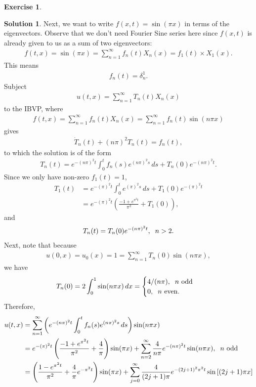 \documentclass{article}
\theoremstyle{definition}
\newtheorem*{exer*}{Exercise}
\newtheorem*{sln*}{Solution}
\begin{document}
\begin{exer*}
\begin{sln*}
		Next, we want to write $f(x,t) = \sin(\pi x)$ in terms of the eigenvectors. Observe that we don't need Fourier Sine series here since $f(x,t)$ is already given to us as a sum of two eigenvectors:
		\begin{align*}
		f(t,x) = \sin(\pi x) = \sum^\infty_{n=1}f_n(t)X_n(x) = f_1(t) \times X_1(x).
		\end{align*}
		This means
		\begin{align*}
		f_n(t) = \delta^1_n.
		\end{align*}
		Subject 
		\begin{align*}
		u(t,x) = \sum^\infty_{n=1} T_n(t)X_n(x)
		\end{align*}
		to the IBVP, where
		\begin{align*}
		f(t,x) = \sum^\infty_{n=1}f_n(t)X_n(x) = \sum^\infty_{n=1}f_n(t)\sin(n\pi x)
		\end{align*}
		gives
		\begin{align*}
		\dot{T}_n(t) + (n\pi)^2T_n(t) = f_n(t),
		\end{align*}
		to which the solution is of the form
		\begin{align*}
		T_n(t) = e^{-(n\pi)^2t}\int^t_0 f_n(s)e^{(n\pi)^2s}\,ds + T_n(0)e^{-(n\pi)^2t}.
		\end{align*}
		Since we only have non-zero $f_1(t) = 1$, 
		\begin{align*}
		T_1(t) &= e^{-(\pi)^2t}\int^t_0 e^{(\pi)^2s}\,ds + T_1(0)e^{-(\pi)^2t}\\
		&= e^{-(\pi)^2t}\left(\frac{-1 + e^{\pi^2t}}{\pi^2}  + T_1(0)\right),
		\end{align*}
		and
		\begin{align*}
		T_n(t) = T_n(0)e^{-(n\pi)^2t}, \hspace{0.2cm}n > 2.
		\end{align*}
		Next, note that because 
		\begin{align*}
		u(0,x) = u_0(x) = 1 = \sum^\infty_{n=1}T_n(0)\sin(n\pi x),
		\end{align*}
		we have
		\begin{align*}
		T_n(0) = 2\int^1_0  \sin(n \pi x)\,dx = \begin{cases}
		4/(n\pi), \hspace{0.2cm}n \text{ odd}\\
		0, \hspace{0.2cm}n \text{ even}.
		\end{cases}
		\end{align*}
		Therefore, 
		\begin{align*}
		u(t,x) &= \sum^\infty_{n=1}\left( e^{-(n\pi)^2t}\int^t_0 f_n(s)e^{(n\pi)^2s}\,ds \right)\sin(n\pi x)\\
		&= e^{-(\pi)^2t}\left(\frac{-1 + e^{\pi^2t}}{\pi^2} + \frac{4}{\pi}\right)\sin(\pi x) + \sum^\infty_{n=2}\frac{4}{n\pi}e^{-(n\pi)^2t}\sin(n\pi x),\hspace{0.2cm}n \text{ odd}\\
		&= \left(\frac{1-e^{\pi^2t}}{\pi^2} + \frac{4}{\pi}e^{-\pi^2t}\right)\sin(\pi x) + \sum^\infty_{j=0}\frac{4}{(2j+1)\pi}e^{-(2j+1)^2\pi^2t}\sin\left[(2j+1)\pi x\right]
		\end{align*}
		

\end{sln*}
\end{exer*}
\end{document}
